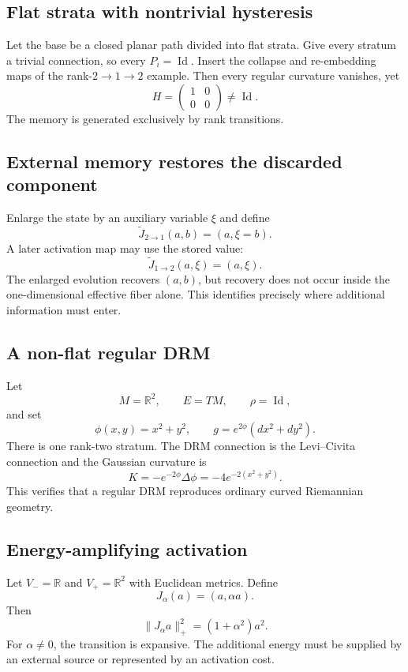 \documentclass[11pt]{article}
\newcommand{\R}{\mathbb{R}}
\newcommand{\Id}{\operatorname{Id}}
\begin{document}
\subsection{Flat strata with nontrivial hysteresis}

Let the base be a closed planar path divided into flat strata. Give every
stratum a trivial connection, so every $P_i=\Id$. Insert the collapse and
re-embedding maps of the rank-$2\to1\to2$ example. Then every regular curvature
vanishes, yet
\[
H=\begin{pmatrix}1&0\\0&0\end{pmatrix}\ne\Id.
\]
The memory is generated exclusively by rank transitions.

\subsection{External memory restores the discarded component}

Enlarge the state by an auxiliary variable $\xi$ and define
\[
\widetilde J_{2\to1}(a,b)=(a,\xi=b).
\]
A later activation map may use the stored value:
\[
\widetilde J_{1\to2}(a,\xi)=(a,\xi).
\]
The enlarged evolution recovers $(a,b)$, but recovery does not occur inside
the one-dimensional effective fiber alone. This identifies precisely where
additional information must enter.

\subsection{A non-flat regular DRM}

Let
\[
M=\R^2,
\qquad
E=TM,
\qquad
\rho=\Id,
\]
and set
\[
\phi(x,y)=x^2+y^2,
\qquad
g=e^{2\phi}(dx^2+dy^2).
\]
There is one rank-two stratum. The DRM connection is the Levi--Civita
connection and the Gaussian curvature is
\[
K=-e^{-2\phi}\Delta\phi
=-4e^{-2(x^2+y^2)}.
\]
This verifies that a regular DRM reproduces ordinary curved Riemannian
geometry.

\subsection{Energy-amplifying activation}

Let $V_-=\R$ and $V_+=\R^2$ with Euclidean metrics. Define
\[
J_\alpha(a)=(a,\alpha a).
\]
Then
\[
\|J_\alpha a\|_+^2=(1+\alpha^2)a^2.
\]
For $\alpha\ne0$, the transition is expansive. The additional energy must be
supplied by an external source or represented by an activation cost.
\end{document}
